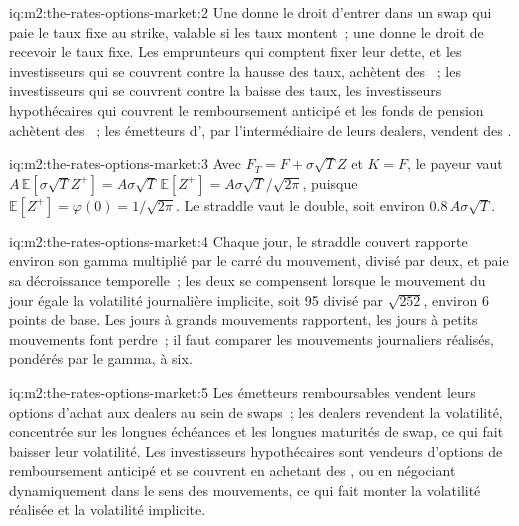 \begin{solution}{iq:m2:the-rates-options-market:2}
Une  donne le droit d'entrer dans un swap qui paie le taux fixe au strike, valable si
les taux montent~; une  donne le droit de recevoir le taux fixe. Les emprunteurs qui comptent fixer
leur dette, et les investisseurs qui se couvrent contre la hausse des taux, achètent des ~; les investisseurs qui se couvrent
contre la baisse des taux, les investisseurs hypothécaires qui couvrent le remboursement anticipé et les fonds de pension achètent
des ~; les émetteurs d', par l'intermédiaire de leurs dealers, vendent des .
\end{solution}

\begin{solution}{iq:m2:the-rates-options-market:3}
Avec $F_T = F + \sigma\sqrt T Z$ et $K = F$, le payeur vaut
$A\,\mathbb{E}[\sigma\sqrt T Z^+] = A\sigma\sqrt T\,\mathbb{E}[Z^+] =
A\sigma\sqrt T/\sqrt{2\pi}$, puisque $\mathbb{E}[Z^+] = \varphi(0) = 1/\sqrt{2\pi}$.
Le straddle vaut le double, soit environ $0.8\,A\sigma\sqrt T$.
\end{solution}

\begin{solution}{iq:m2:the-rates-options-market:4}
Chaque jour, le straddle couvert rapporte environ son gamma multiplié par le carré du
mouvement, divisé par deux, et paie sa décroissance temporelle~; les deux se compensent lorsque le
mouvement du jour égale la volatilité journalière implicite, soit 95 divisé par $\sqrt{252}$, environ 6 points de base. Les jours
à grands mouvements rapportent, les jours à petits mouvements font perdre~; il faut comparer les mouvements
journaliers réalisés, pondérés par le gamma, à six.
\end{solution}

\begin{solution}{iq:m2:the-rates-options-market:5}
Les émetteurs remboursables vendent leurs options d'achat aux dealers au sein de swaps~; les dealers revendent la
volatilité, concentrée sur les longues échéances et les longues maturités de swap, ce qui fait baisser leur volatilité.
Les investisseurs hypothécaires sont vendeurs d'options de remboursement anticipé et se couvrent
en achetant des , ou en négociant dynamiquement dans le sens des mouvements, ce qui
fait monter la volatilité réalisée et la volatilité implicite.
\end{solution}

